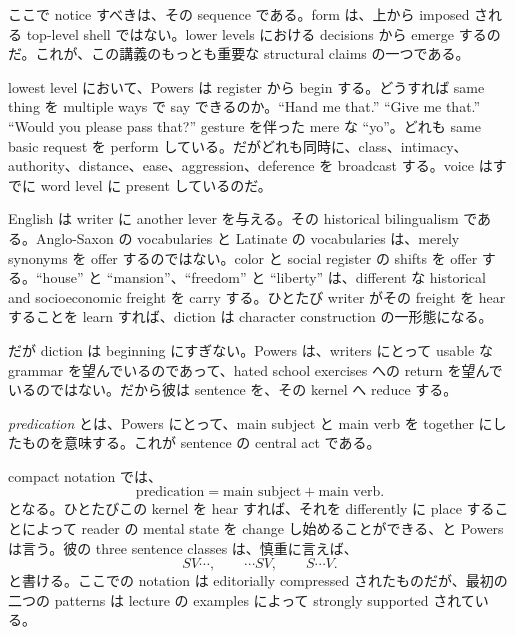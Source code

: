 ここで notice すべきは、その sequence である。form は、上から imposed される top-level shell ではない。lower levels における decisions から emerge するのだ。これが、この講義のもっとも重要な structural claims の一つである。

lowest level において、Powers は register から begin する。どうすれば same thing を multiple ways で say できるのか。``Hand me that.'' ``Give me that.'' ``Would you please pass that?'' gesture を伴った mere な ``yo''。どれも same basic request を perform している。だがどれも同時に、class、intimacy、authority、distance、ease、aggression、deference を broadcast する。voice はすでに word level に present しているのだ。

English は writer に another lever を与える。その historical bilingualism である。Anglo-Saxon の vocabularies と Latinate の vocabularies は、merely synonyms を offer するのではない。color と social register の shifts を offer する。``house'' と ``mansion''、``freedom'' と ``liberty'' は、different な historical and socioeconomic freight を carry する。ひとたび writer がその freight を hear することを learn すれば、diction は character construction の一形態になる。

だが diction は beginning にすぎない。Powers は、writers にとって usable な grammar を望んでいるのであって、hated school exercises への return を望んでいるのではない。だから彼は sentence を、その kernel へ reduce する。

\begin{definition}
\emph{predication} とは、Powers にとって、main subject と main verb を together にしたものを意味する。これが sentence の central act である。
\end{definition}

compact notation では、
\begin{equation}
\text{predication} = \text{main subject} + \text{main verb}.
\end{equation}
となる。ひとたびこの kernel を hear すれば、それを differently に place することによって reader の mental state を change し始めることができる、と Powers は言う。彼の three sentence classes は、慎重に言えば、
\begin{equation}
SV\cdots,\qquad \cdots SV,\qquad S\cdots V.
\end{equation}
と書ける。ここでの notation は editorially compressed されたものだが、最初の二つの patterns は lecture の examples によって strongly supported されている。

